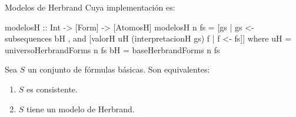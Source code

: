 \documentclass[final]{beamer}
\newlength{\onecolwid}
\begin{document}
\begin{frame}[t,fragile]
\begin{columns}[t]
\begin{column}{\onecolwid}
\begin{block}{Modelos de Herbrand}
  Cuya implementación es:

  \begin{code}
modelosH :: Int -> [Form] -> [AtomosH]
modelosH n fs = [gs | gs <- subsequences bH
 , and [valorH uH (interpretacionH gs) f | f <- fs]]
  where uH = universoHerbrandForms n fs
        bH = baseHerbrandForms n fs
  \end{code}


\end{block}

\begin{Prop}
  Sea $S$ un conjunto de fórmulas básicas. Son equivalentes:
  \begin{enumerate}
    \item $S$ es consistente.
    \item $S$ tiene un modelo de Herbrand.
  \end{enumerate}
\end{Prop}




\end{column} %

\end{columns} %

\end{frame}


\end{document}
